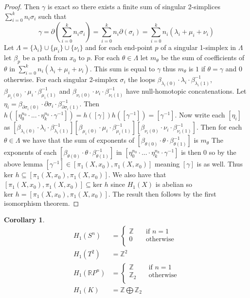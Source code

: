 \documentclass{article}
\newtheorem{corollary}[theorem]{Corollary}
\begin{document}
\begin{proof}
Then $\gamma$ is exact so there exists a finite sum of singular 2-simplices $\sum_{i=0}^kn_i\sigma_i$ such that \[\gamma=\partial(\sum_{i=0}^kn_i\sigma_i)=\sum_{i=0}^kn_i\partial(\sigma_i)=\sum_{i=0}^kn_i(\lambda_i+\mu_i+\nu_i)\] Let $\Lambda=\{\lambda_i\}\cup\{\mu_i\}\cup\{\nu_i\}$ and for each end-point $p$ of a singular 1-simplex in $\Lambda$ let $\beta_p$ be a path from $x_0$ to $p$. For each $\theta\in\Lambda$ let $m_\theta$ be the sum of coefficients of $\theta$ in $\sum_{i=0}^kn_i(\lambda_i+\mu_i+\nu_i)$. This sum is equal to $\gamma$ thus $m_\theta$ is $1$ if $\theta=\gamma$ and $0$ otherwise. For each singular 2-simplex $\sigma_i$ the loops $\beta_{\lambda_i(0)}\cdot\lambda_i\cdot\beta_{\lambda_i(1)}^{-1}$, $\beta_{\mu_i(0)}\cdot\mu_i\cdot\beta_{\mu_i(1)}^{-1}$ and $\beta_{\nu_i(0)}\cdot\nu_i\cdot\beta_{\nu_i(1)}^{-1}$ have null-homotopic concatenations. Let $\eta_i=\beta_{\partial\sigma_i(0)}\cdot\partial\sigma_i\cdot\beta_{\partial\sigma_i(1)}^{-1}$. Then $h([\eta_0^{n_0}\cdot...\cdot\eta_k^{n_k}\cdot\gamma^{-1}])=h([\gamma])h([\gamma^{-1}])=[\gamma^{-1}]$. Now write each $[\eta_i]$ as $[\beta_{\lambda_i(0)}\cdot\lambda_i\cdot\beta_{\lambda_i(1)}^{-1}][\beta_{\mu_i(0)}\cdot\mu_i\cdot\beta_{\mu_i(1)}^{-1}][\beta_{\nu_i(0)}\cdot\nu_i\cdot\beta_{\nu_i(1)}^{-1}]$. Then for each $\theta\in\Lambda$ we have that the sum of exponents of $[\beta_{\theta(0)}\cdot\theta\cdot\beta_{\theta(1)}^{-1}]$ is $m_\theta$ The exponents of each $[\beta_{\theta(0)}\cdot\theta\cdot\beta_{\theta(1)}^{-1}]$ in $[\eta_0^{n_0}\cdot...\cdot\eta_k^{n_k}\cdot\gamma^{-1}]$ is then 0 so by the above lemma $[\gamma^{-1}]\in[\pi_1(X,x_0),\pi_1(X,x_0)]$ meaning $[\gamma]$ is as well. Thus $\text{ker }h\subseteq [\pi_1(X,x_0),\pi_1(X,x_0)]$. We also have that $[\pi_1(X,x_0),\pi_1(X,x_0)]\subseteq \text{ker }h$ since $H_1(X)$ is abelian so $\text{ker }h=[\pi_1(X,x_0),\pi_1(X,x_0)]$. The result then follows by the first isomorphism theorem.
\end{proof}

\begin{corollary}
\begin{align*}
H_1(S^n)&=\begin{cases}
       \mathbb{Z} &\quad\text{if }n=1 \\
       0 &\quad\text{otherwise} \\ 
     \end{cases}\\
H_1(T^2)&=\mathbb{Z}^2\\
H_1(\mathbb{R}P^n)&=\begin{cases}
       \mathbb{Z} &\quad\text{if }n=1 \\
       \mathbb{Z}_2 &\quad\text{otherwise} \\ 
     \end{cases}\\
H_1(K)&=\mathbb{Z}\bigoplus\mathbb{Z}_2
\end{align*}
\end{corollary}
\end{document}
